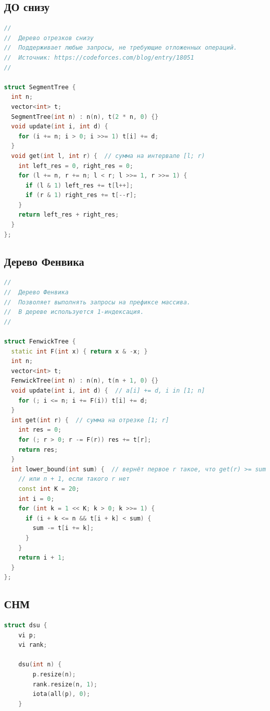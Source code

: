\documentclass[10pt,a4paper,landscape,twosided]{extarticle}
\begin{document}
\begin{multicols}{3}
\subsection{ДО снизу}
\begin{lstlisting}[language=C++]
//
//  Дерево отрезков снизу
//  Поддерживает любые запросы, не требующие отложенных операций.
//  Источник: https://codeforces.com/blog/entry/18051
//

struct SegmentTree {
  int n;
  vector<int> t;
  SegmentTree(int n) : n(n), t(2 * n, 0) {}
  void update(int i, int d) {
    for (i += n; i > 0; i >>= 1) t[i] += d;
  }
  void get(int l, int r) {  // сумма на интервале [l; r)
    int left_res = 0, right_res = 0;
    for (l += n, r += n; l < r; l >>= 1, r >>= 1) {
      if (l & 1) left_res += t[l++];
      if (r & 1) right_res += t[--r];
    }
    return left_res + right_res;
  }
};
\end{lstlisting}

\subsection{Дерево Фенвика}
\begin{lstlisting}[language=C++]
//
//  Дерево Фенвика
//  Позволяет выполнять запросы на префиксе массива.
//  В дереве используется 1-индексация.
//

struct FenwickTree {
  static int F(int x) { return x & -x; }
  int n;
  vector<int> t;
  FenwickTree(int n) : n(n), t(n + 1, 0) {}
  void update(int i, int d) {  // a[i] += d, i in [1; n]
    for (; i <= n; i += F(i)) t[i] += d;
  }
  int get(int r) {  // сумма на отрезке [1; r]
    int res = 0;
    for (; r > 0; r -= F(r)) res += t[r];
    return res;
  }
  int lower_bound(int sum) {  // вернёт первое r такое, что get(r) >= sum
    // или n + 1, если такого r нет
    const int K = 20;
    int i = 0;
    for (int k = 1 << K; k > 0; k >>= 1) {
      if (i + k <= n && t[i + k] < sum) {
        sum -= t[i += k];
      }
    }
    return i + 1;
  }
};
\end{lstlisting}

\subsection{СНМ}
\begin{lstlisting}[language=C++]
struct dsu {
    vi p;
    vi rank;

    dsu(int n) {
        p.resize(n);
        rank.resize(n, 1);
        iota(all(p), 0);
    }


\end{lstlisting}
\end{multicols}
\end{document}
